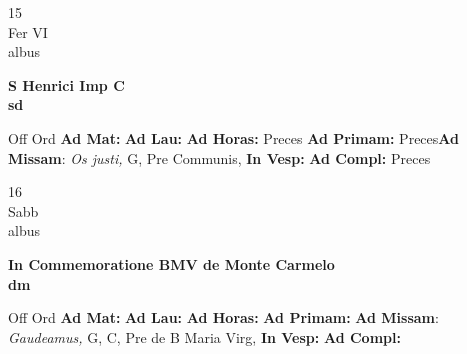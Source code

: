\documentclass[10pt, openany]{book}
\begin{document}
    \begin{center}
        \begin{minipage}{3.5in}
            \vspace{2em}
            \begin{minipage}{0.5in}
                {\Huge 15} \\
                {\normalsize Fer VI} \\
                {\normalsize albus}
            \end{minipage}
            \begin{minipage}{3.0in}
                \textbf{ \large S Henrici Imp C \\
                \textnormal{\normalsize sd}} \\ 
            \end{minipage}
            \begin{justify}Off Ord
                \textbf{Ad Mat: }
                \textbf{Ad Lau: }
                \textbf{Ad Horas: }Preces
                \textbf{Ad Primam: }Preces\textbf{Ad Missam}: \textit{Os justi,} G, Pre Communis,  
                \textbf{In Vesp: }
                \textbf{Ad Compl: }Preces
            \end{justify}
        \end{minipage}
    \end{center}

    \begin{center}
        \begin{minipage}{3.5in}
            \vspace{2em}
            \begin{minipage}{0.5in}
                {\Huge 16} \\
                {\normalsize Sabb} \\
                {\normalsize albus}
            \end{minipage}
            \begin{minipage}{3.0in}
                \textbf{ \large In Commemoratione BMV de Monte Carmelo \\
                \textnormal{\normalsize dm}} \\ 
            \end{minipage}
            \begin{justify}Off Ord
                \textbf{Ad Mat: }
                \textbf{Ad Lau: }
                \textbf{Ad Horas: }
                \textbf{Ad Primam: }\textbf{Ad Missam}: \textit{Gaudeamus,} G, C, Pre  de B Maria Virg,  
                \textbf{In Vesp: }
                \textbf{Ad Compl: }
            \end{justify}
        \end{minipage}
    \end{center}
\end{document}
